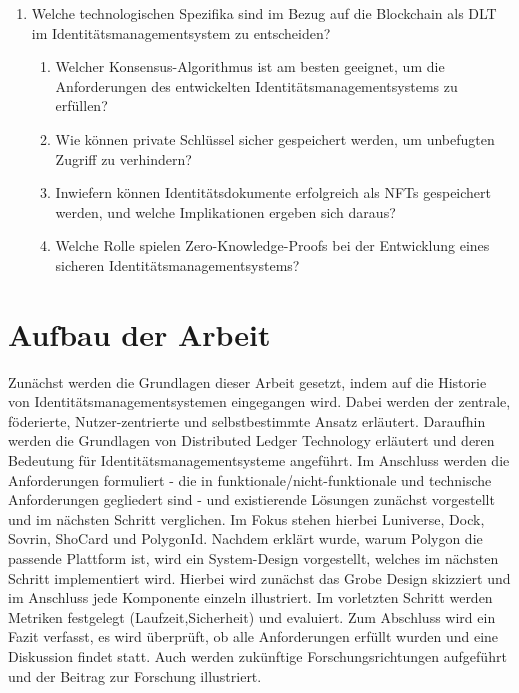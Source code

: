 \begin{enumerate}
\item Welche technologischen Spezifika sind im Bezug auf die Blockchain als DLT im Identitätsmanagementsystem zu entscheiden?
\begin{enumerate}
	\item Welcher Konsensus-Algorithmus ist am besten geeignet, um die Anforderungen des entwickelten Identitätsmanagementsystems zu erfüllen?
	\item Wie können private Schlüssel sicher gespeichert werden, um unbefugten Zugriff zu verhindern?
	\item Inwiefern können Identitätsdokumente erfolgreich als NFTs gespeichert werden, und welche Implikationen ergeben sich daraus?
	\item Welche Rolle spielen Zero-Knowledge-Proofs bei der Entwicklung eines sicheren Identitätsmanagementsystems?
\end{enumerate}
\end{enumerate}

\section{Aufbau der Arbeit}
Zunächst werden die Grundlagen dieser Arbeit gesetzt, indem auf die Historie von Identitätsmanagementsystemen eingegangen wird. Dabei werden der zentrale, föderierte, Nutzer-zentrierte und selbstbestimmte Ansatz erläutert. Daraufhin werden die Grundlagen von Distributed Ledger Technology erläutert und deren Bedeutung für Identitätsmanagementsysteme angeführt. Im Anschluss werden die Anforderungen formuliert - die in funktionale/nicht-funktionale und technische Anforderungen gegliedert sind - und existierende Lösungen zunächst vorgestellt und im nächsten Schritt verglichen. Im Fokus stehen hierbei Luniverse, Dock, Sovrin, ShoCard und PolygonId. Nachdem erklärt wurde, warum Polygon die passende Plattform ist, wird ein System-Design vorgestellt, welches im nächsten Schritt implementiert wird. Hierbei wird zunächst das Grobe Design skizziert und im Anschluss jede Komponente einzeln illustriert. Im vorletzten Schritt werden Metriken festgelegt (Laufzeit,Sicherheit) und evaluiert. Zum Abschluss wird ein Fazit verfasst, es wird überprüft, ob alle Anforderungen erfüllt wurden und eine Diskussion findet statt. Auch werden zukünftige Forschungsrichtungen aufgeführt und der Beitrag zur Forschung illustriert.